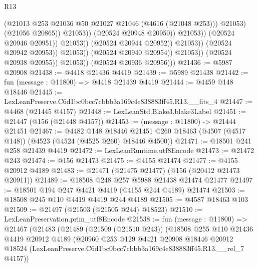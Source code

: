 \begin{lexlean}{R13}
\begin{coremodule}
                                                    (@21013
                                                      @253
                                                      @21036
                                                      @50
                                                      @21027
                                                      @21046
                                                      (@4616 (@21048 @253)))
                                                    @21053)
                                                  (@21056 @20865))
                                                @21053))
                                            (@20524 @20948 @20950))
                                          @21053))
                                      (@20524 @20946 @20951))
                                    @21053))
                                (@20524 @20944 @20952))
                              @21053))
                          (@20524 @20942 @20953))
                        @21053))
                    (@20524 @20940 @20954))
                  @21053))
              (@20524 @20938 @20955))
            @21053))
        (@20524 @20936 @20956)))
@21436 := @5987 @20908
@21438 := @4418 @21436 @4419
@21439 := @5989 @21438
@21442 := fun (message : @11800) => @4418 @21439 @4419
@21444 := @4459 @148 @18446
@21445 := LexLeanPreserve.C6d1bc0bcc7cbbb3a169c4e838883ff45.R13.__fits_4
@21447 := @4468 (@21445 @4157)
@21448 := LexLeanStd.Blake3.blake3Label
@21451 := @21447 (@156 (@21448 @4157))
@21453 := (message : @11800) -> @21444 @21451
@21467 := @4482
    @148
    @18446
    @21451
    @260
    @18463
    (@4507 (@4517 @148))
    (@4523 (@4524 (@4525 @260) @18446 @4500))
@21471 := @18501 @241 @258 @21439 @4419
@21472 := LexLeanRuntime.utf8Encode
@21473 := @21472 @243
@21474 := @156 @21473
@21475 := @4155 @21474
@21477 := @4155 @20912 @4189
@21483 := @21471 (@21475 @21477) (@156 (@20412 @21473 @20911))
@21489 := @18508 @248 @257 @5988 @21438 @21474 @21477
@21497 := @18501 @194 @247 @4421 @4419 (@4155 @244 @4189) @21474
@21503 := @18508 @245 @110 @4419 @4419 @244 @4189
@21505 := @4587 @18463 @103
@21509 := @21497 (@21503 (@21505 @244) @18523)
@21510 := LexLeanPreservation.prim_utf8Encode
@21538 := fun (message : @11800) =>
  @21467
    (@21483
      (@21489
        (@21509 (@21510 @243))
        (@18508
          @255
          @110
          @21436
          @4419
          @20912
          @4189
          (@20960
            @253
            @129
            @4421
            @20908
            @18446
            @20912
            @18524
            (LexLeanPreserve.C6d1bc0bcc7cbbb3a169c4e838883ff45.R13.__rel_7 @4157))

\end{coremodule}
\end{lexlean}
